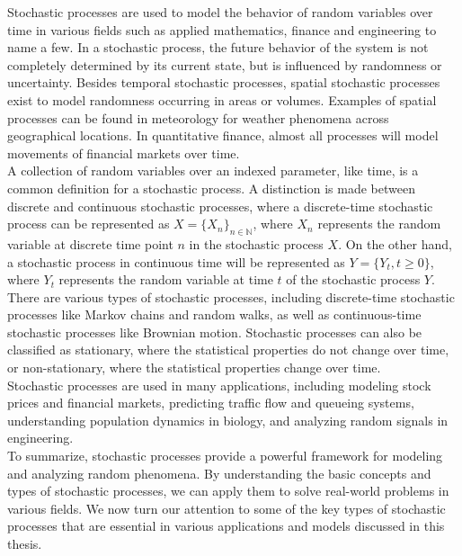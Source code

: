 Stochastic processes are used to model the behavior of random variables over time in various fields such as applied mathematics, finance and engineering to name a few. In a stochastic process, the future behavior of the system is not completely determined by its current state, but is influenced by randomness or uncertainty. Besides temporal stochastic processes, spatial stochastic processes exist to model randomness occurring in areas or volumes. Examples of spatial processes can be found in meteorology for weather phenomena across geographical locations. In quantitative finance, almost all processes will model movements of financial markets over time.\\ 

A collection of random variables over an indexed parameter, like time, is a common definition for a stochastic process. A distinction is made between discrete and continuous stochastic processes, where a discrete-time stochastic process can be represented as $X=\{X_n\}_{n\in\mathbb{N}}$, where $X_n$ represents the random variable at discrete time point $n$ in the stochastic process $X$. On the other hand, a stochastic process in continuous time will be represented as $Y=\{Y_{t},t\geq0\}$, where $Y_{t}$ represents the random variable at time $t$ of the stochastic process $Y$.\\

There are various types of stochastic processes, including discrete-time stochastic processes like Markov chains and random walks, as well as continuous-time stochastic processes like Brownian motion. Stochastic processes can also be classified as stationary, where the statistical properties do not change over time, or non-stationary, where the statistical properties change over time.\\

Stochastic processes are used in many applications, including modeling stock prices and financial markets, predicting traffic flow and queueing systems, understanding population dynamics in biology, and analyzing random signals in engineering.\\

To summarize, stochastic processes provide a powerful framework for modeling and analyzing random phenomena. By understanding the basic concepts and types of stochastic processes, we can apply them to solve real-world problems in various fields. We now turn our attention to some of the key types of stochastic processes that are essential in various applications and models discussed in this thesis.\\

